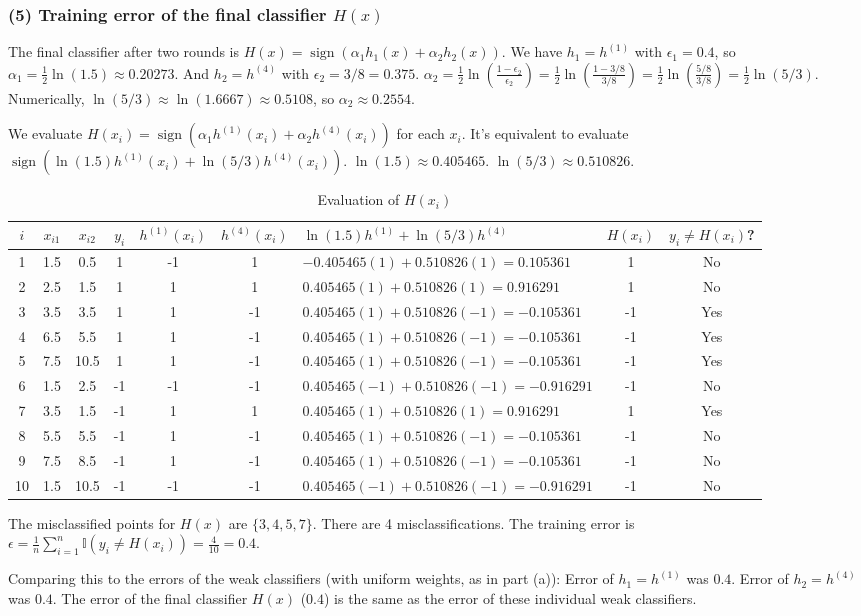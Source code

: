 \subsubsection*{(5) Training error of the final classifier $H(x)$}
The final classifier after two rounds is $H(x) = \operatorname{sign}(\alpha_1 h_1(x) + \alpha_2 h_2(x))$.
We have $h_1 = h^{(1)}$ with $\epsilon_1 = 0.4$, so $\alpha_1 = \frac{1}{2}\ln(1.5) \approx 0.20273$.
And $h_2 = h^{(4)}$ with $\epsilon_2 = 3/8 = 0.375$.
$\alpha_2 = \frac{1}{2} \ln\left(\frac{1-\epsilon_2}{\epsilon_2}\right) = \frac{1}{2} \ln\left(\frac{1-3/8}{3/8}\right) = \frac{1}{2} \ln\left(\frac{5/8}{3/8}\right) = \frac{1}{2} \ln(5/3)$.
Numerically, $\ln(5/3) \approx \ln(1.6667) \approx 0.5108$, so $\alpha_2 \approx 0.2554$.

We evaluate $H(x_i) = \operatorname{sign}(\alpha_1 h^{(1)}(x_i) + \alpha_2 h^{(4)}(x_i))$ for each $x_i$.
It's equivalent to evaluate $\operatorname{sign}(\ln(1.5) h^{(1)}(x_i) + \ln(5/3) h^{(4)}(x_i))$.
$\ln(1.5) \approx 0.405465$. $\ln(5/3) \approx 0.510826$.

\begin{table}[htbp]
\centering
\begin{tabular}{|c|c|c|c|c|c|p{3.5cm}|c|c|}
\hline
$i$ & $x_{i1}$ & $x_{i2}$ & $y_i$ & $h^{(1)}(x_i)$ & $h^{(4)}(x_i)$ & $\ln(1.5)h^{(1)} + \ln(5/3)h^{(4)}$ & $H(x_i)$ & $y_i \neq H(x_i)$? \\ \hline
1 & 1.5 & 0.5 & 1 & -1 & 1 & $-0.405465(1) + 0.510826(1) = 0.105361$ & 1 & No \\
2 & 2.5 & 1.5 & 1 & 1 & 1 & $0.405465(1) + 0.510826(1) = 0.916291$ & 1 & No \\
3 & 3.5 & 3.5 & 1 & 1 & -1 & $0.405465(1) + 0.510826(-1) = -0.105361$ & -1 & Yes \\
4 & 6.5 & 5.5 & 1 & 1 & -1 & $0.405465(1) + 0.510826(-1) = -0.105361$ & -1 & Yes \\
5 & 7.5 & 10.5 & 1 & 1 & -1 & $0.405465(1) + 0.510826(-1) = -0.105361$ & -1 & Yes \\
6 & 1.5 & 2.5 & -1 & -1 & -1 & $0.405465(-1) + 0.510826(-1) = -0.916291$ & -1 & No \\
7 & 3.5 & 1.5 & -1 & 1 & 1 & $0.405465(1) + 0.510826(1) = 0.916291$ & 1 & Yes \\
8 & 5.5 & 5.5 & -1 & 1 & -1 & $0.405465(1) + 0.510826(-1) = -0.105361$ & -1 & No \\
9 & 7.5 & 8.5 & -1 & 1 & -1 & $0.405465(1) + 0.510826(-1) = -0.105361$ & -1 & No \\
10 & 1.5 & 10.5 & -1 & -1 & -1 & $0.405465(-1) + 0.510826(-1) = -0.916291$ & -1 & No \\
\hline
\end{tabular}
\caption{Evaluation of $H(x_i)$}
\label{tab:H_eval}
\end{table}
The misclassified points for $H(x)$ are $\{3, 4, 5, 7\}$. There are 4 misclassifications.
The training error is $\epsilon = \frac{1}{n} \sum_{i=1}^{n} \mathbb{I}(y_i \neq H(x_i)) = \frac{4}{10} = 0.4$.

Comparing this to the errors of the weak classifiers (with uniform weights, as in part (a)):
Error of $h_1 = h^{(1)}$ was $0.4$.
Error of $h_2 = h^{(4)}$ was $0.4$.
The error of the final classifier $H(x)$ ($0.4$) is the same as the error of these individual weak classifiers.

\newpage